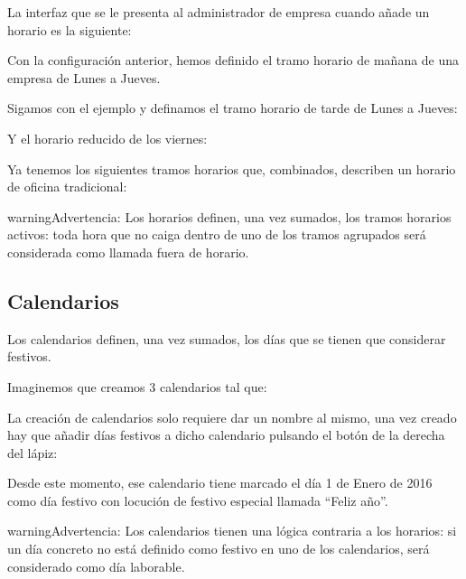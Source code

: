 \documentclass[letterpaper,10pt,spanish]{sphinxmanual}
\begin{document}
La interfaz que se le presenta al administrador de empresa cuando añade un horario es la siguiente:

\noindent{}

Con la configuración anterior, hemos definido el tramo horario de mañana de una empresa de Lunes a Jueves.

Sigamos con el ejemplo y definamos el tramo horario de tarde de Lunes a Jueves:

\noindent{}

Y el horario reducido de los viernes:

\noindent{}

Ya tenemos los siguientes tramos horarios que, combinados, describen un horario de oficina tradicional:

\noindent{}

\begin{notice}{warning}{Advertencia:}
Los horarios definen, una vez sumados, los tramos horarios activos: toda hora que no caiga dentro de uno de los tramos agrupados será considerada como llamada fuera de horario.
\end{notice}


\subsection{Calendarios}
\label{pbx_features/external_filters:calendars}
Los calendarios definen, una vez sumados, los días que se tienen que considerar festivos.

Imaginemos que creamos 3 calendarios tal que:

\noindent{}

La creación de calendarios solo requiere dar un nombre al mismo, una vez creado hay que añadir días festivos a dicho calendario pulsando el botón de la derecha del lápiz:

\noindent{}

Desde este momento, ese calendario tiene marcado el día 1 de Enero de 2016 como día festivo con locución de festivo especial llamada ``Feliz año''.

\begin{notice}{warning}{Advertencia:}
Los calendarios tienen una lógica contraria a los horarios: si un día concreto no está definido como festivo en uno de los calendarios, será considerado como día laborable.
\end{notice}
\end{document}
